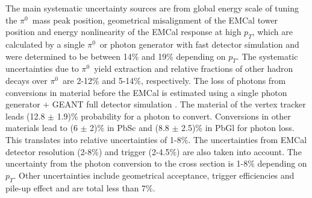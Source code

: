 \documentclass[twocolumn,letterpaper,aps,prl,longbibliography,superscriptaddress,floatfix]{revtex4-2}
\newcommand{\pT}{\ensuremath{p_T}}
\newcommand{\pizero}{\ensuremath{\pi^0}}
\begin{document}
The main systematic uncertainty sources are from global energy scale of tuning the \pizero\ mass peak position, geometrical misalignment of the EMCal tower position and energy nonlinearity of the EMCal response at high \pT, which are calculated by a single \pizero\ or photon generator with fast detector simulation and were determined to be between 14\% and 19\% depending on \pT. The systematic uncertainties due to \pizero\ yield extraction and relative fractions of other hadron decays over \pizero\ are 2-12\% and 5-14\%, respectively. The loss of photons from conversions in material before the EMCal is estimated using a single photon generator + GEANT full detector simulation \cite{Brun:1994aa}. The material of the vertex tracker \cite{SONDHEIM2012993} leads (12.8 $\pm$ 1.9)\% probability for a photon to convert. Conversions in other materials lead to (6 $\pm$ 2)\% in PbSc and (8.8 $\pm$ 2.5)\% in PbGl for photon loss. This translates into relative uncertainties of 1-8\%. The uncertainties from EMCal detector resolution (2-8\%) and trigger (2-4.5\%) are also taken into account. The uncertainty from the photon conversion to the cross section is 1-8\% depending on \pT. Other uncertainties include geometrical acceptance, trigger efficiencies and pile-up effect and are total less than 7\%.
\end{document}
